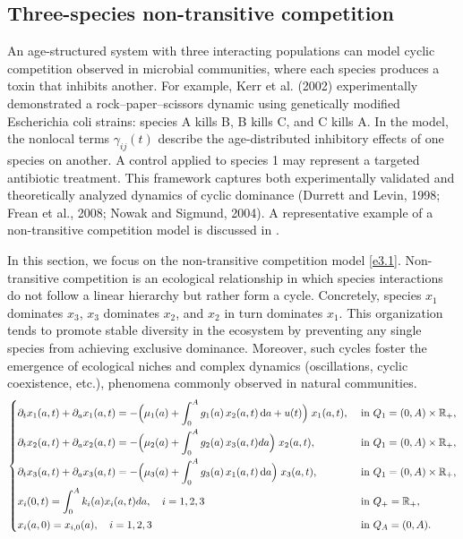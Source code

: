 \documentclass[10pt, a4paper]{amsart}
\theoremstyle{plain}
\theoremstyle{definition}
\theoremstyle{remark}
\numberwithin{equation}{section}
\begin{document}
\subsection{\bf Three-species non-transitive competition}\label{se3.1}
 An age-structured system with three interacting populations can model cyclic competition observed in microbial communities, where each species produces a toxin that inhibits another. For example, Kerr et al. (2002) experimentally demonstrated a rock–paper–scissors dynamic using genetically modified Escherichia coli strains: species A kills B, B kills C, and C kills A. In the model, the nonlocal terms $\gamma_{ij}(t)$ describe the age-distributed inhibitory effects of one species on another. A control applied to species 1 may represent a targeted antibiotic treatment. This framework captures both experimentally validated and theoretically analyzed dynamics of cyclic dominance (Durrett and Levin, 1998; Frean et al., 2008; Nowak and Sigmund, 2004). A representative example of a non-transitive competition model is discussed in \cite{ref3}.%

In this section, we focus on the non-transitive competition model \eqref{e3.1}. Non-transitive competition is an ecological relationship in which species interactions do not follow a linear hierarchy but rather form a cycle. Concretely, species $x_{1}$ dominates $x_{3}$, $x_{3}$ dominates $x_{2}$, and $x_{2}$ in turn dominates $x_{1}$. This organization tends to promote stable diversity in the ecosystem by preventing any single species from achieving exclusive dominance. Moreover, such cycles foster the emergence of ecological niches and complex dynamics (oscillations, cyclic coexistence, etc.), phenomena commonly observed in natural communities.
\begin{align}\label{e3.1}
 \begin{cases}
\displaystyle 
\partial_t x_1(a,t) + \partial_a x_1(a,t)
= -\Bigl(\mu_1(a) 
       + \int_0^A g_1(a)\,x_2(a,t)\,\mathrm{d}a
       + u(t)\Bigr)\;x_1(a,t),
& \text{ in } Q_1=(0,A)\times\mathbb{R}_+,\\[8pt]
\displaystyle 
\partial_t x_2(a,t) + \partial_a x_2(a,t)
= -\Bigl(\mu_2(a) 
       + \int_0^A g_2(a)\,x_3(a,t)da\Bigr)\;x_2(a,t),
& \text{ in } Q_1=(0,A)\times\mathbb{R}_+,\\[8pt]
\partial_t x_3(a,t) + \partial_a x_3(a,t)
= -\Bigl(\mu_3(a) 
       + \displaystyle\int_0^A g_3(a)\,x_1(a,t)\,\mathrm{d}a
       \Bigr)\;x_3(a,t),
& \text{ in } Q_1=(0,A)\times\mathbb{R}_+,\\[8pt]
\displaystyle 
x_i(0,t)
= \int_0^Ak_i(a)x_i(a,t)da,\quad i=1,2,3 & \text{ in } Q_+=\mathbb{R}_+,\\[8pt]
x_i(a,0) = x_{i,0}(a),\quad i=1,2,3
& \text{ in } Q_A=(0,A).
\end{cases}
\end{align}
\end{document}
